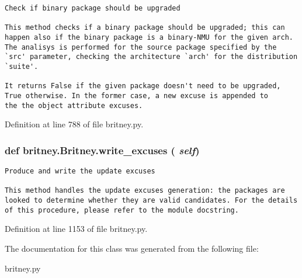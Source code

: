 \footnotesize\begin{verbatim}Check if binary package should be upgraded

This method checks if a binary package should be upgraded; this can
happen also if the binary package is a binary-NMU for the given arch.
The analisys is performed for the source package specified by the
`src' parameter, checking the architecture `arch' for the distribution
`suite'.
       
It returns False if the given package doesn't need to be upgraded,
True otherwise. In the former case, a new excuse is appended to
the the object attribute excuses.
\end{verbatim}
\normalsize
 

Definition at line 788 of file britney.py.
\subsubsection{\setlength{\rightskip}{0pt plus 5cm}def britney.Britney.write\_\-excuses ( {\em self})}\label{classbritney_1_1Britney_010f6deffca32f7f71ecf1f5c1bb4985}




\footnotesize\begin{verbatim}Produce and write the update excuses

This method handles the update excuses generation: the packages are
looked to determine whether they are valid candidates. For the details
of this procedure, please refer to the module docstring.
\end{verbatim}
\normalsize
 

Definition at line 1153 of file britney.py.

The documentation for this class was generated from the following file:\begin{CompactItemize}
\item 
britney.py\end{CompactItemize}
